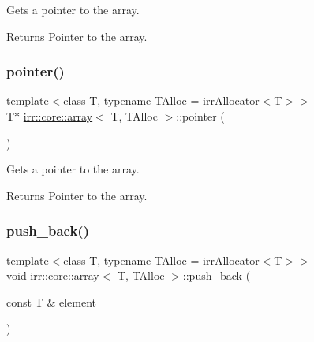 Gets a pointer to the array. 

\begin{DoxyReturn}{Returns}
Pointer to the array. 
\end{DoxyReturn}
\mbox{\label{classirr_1_1core_1_1array_a7b29797486e1c2ab3e7821082dab998c}} 
\subsubsection{\texorpdfstring{pointer()}{pointer()}\hspace{0.1cm}{\footnotesize\ttfamily [2/2]}}
{\footnotesize\ttfamily template$<$class T, typename T\+Alloc = irr\+Allocator$<$\+T$>$$>$ \\
T$\ast$ \hyperlink{classirr_1_1core_1_1array}{irr\+::core\+::array}$<$ T, T\+Alloc $>$\+::pointer (\begin{DoxyParamCaption}{ }\end{DoxyParamCaption})\hspace{0.3cm}{\ttfamily [inline]}}



Gets a pointer to the array. 

\begin{DoxyReturn}{Returns}
Pointer to the array. 
\end{DoxyReturn}
\mbox{\label{classirr_1_1core_1_1array_ad2c9dff8592b95c25c59f5383fc633fe}} 
\subsubsection{\texorpdfstring{push\+\_\+back()}{push\_back()}\hspace{0.1cm}{\footnotesize\ttfamily [1/2]}}
{\footnotesize\ttfamily template$<$class T, typename T\+Alloc = irr\+Allocator$<$\+T$>$$>$ \\
void \hyperlink{classirr_1_1core_1_1array}{irr\+::core\+::array}$<$ T, T\+Alloc $>$\+::push\+\_\+back (\begin{DoxyParamCaption}\item[{const T \&}]{element }\end{DoxyParamCaption})\hspace{0.3cm}{\ttfamily [inline]}}



